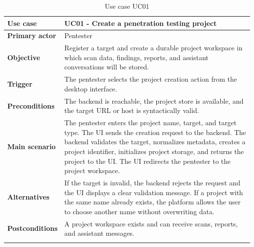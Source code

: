 \documentclass[12pt,a4paper]{report}
\begin{document}
\begin{longtable}{|p{}|p{}|}
\hline
\textbf{Use case} & UC01 - Create a penetration testing project \\
\hline
\textbf{Primary actor} & Pentester \\
\hline
\textbf{Objective} & Register a target and create a durable project workspace in
which scan data, findings, reports, and assistant conversations will be stored. \\
\hline
\textbf{Trigger} & The pentester selects the project creation action from the desktop
interface. \\
\hline
\textbf{Preconditions} & The backend is reachable, the project store is available, and
the target URL or host is syntactically valid. \\
\hline
\textbf{Main scenario} &
The pentester enters the project name, target, and target type. The UI sends the
creation request to the backend. The backend validates the target, normalizes metadata,
creates a project identifier, initializes project storage, and returns the project to
the UI. The UI redirects the pentester to the project workspace. \\
\hline
\textbf{Alternatives} & If the target is invalid, the backend rejects the request and
the UI displays a clear validation message. If a project with the same name already
exists, the platform allows the user to choose another name without overwriting data. \\
\hline
\textbf{Postconditions} & A project workspace exists and can receive scans, reports,
and assistant messages. \\
\hline
\caption{Use case UC01}
\label{tab:uc01}
\end{longtable}
\end{document}
